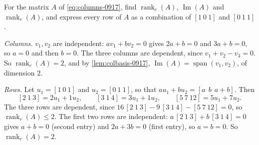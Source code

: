 \begin{exercisebox}
\begin{exercise}\label{ex:example-rank-0917}
    For the matrix $A$ of \cref{eq:columns-0917}, find $\operatorname{rank}_c(A)$,
    $\operatorname{Im}(A)$ and $\operatorname{rank}_r(A)$, and express every row of $A$ as a combination
    of $[1\ 0\ 1]$ and $[0\ 1\ 1]$.
\end{exercise}
\tcblower
\begin{wsolution}
    \emph{Columns.} $v_1, v_2$ are independent: $a v_1 + b v_2 = 0$ gives $2a + b = 0$ and
    $3a + b = 0$, so $a = 0$ and then $b = 0$. The three columns are dependent, since
    $v_1 + v_2 - v_3 = 0$. So $\operatorname{rank}_c(A) = 2$, and by \cref{lem:colbasis-0917},
    $\operatorname{Im}(A) = \operatorname{span}(v_1, v_2)$, of dimension $2$.

    \emph{Rows.} Let $u_1 = [1\ 0\ 1]$ and $u_2 = [0\ 1\ 1]$, so that $a u_1 + b u_2 = [a\ \ b\ \ a + b]$.
    Then
    \[[2\ 1\ 3] = 2 u_1 + 1 u_2, \qquad [3\ 1\ 4] = 3 u_1 + 1 u_2, \qquad [5\ 7\ 12] = 5 u_1 + 7 u_2.\]
    The three rows are dependent, since $16\,[2\ 1\ 3] - 9\,[3\ 1\ 4] - [5\ 7\ 12] = 0$, so
    $\operatorname{rank}_r(A) \leq 2$. The
    first two rows are independent: $a\,[2\ 1\ 3] + b\,[3\ 1\ 4] = 0$ gives $a + b = 0$ (second entry)
    and $2a + 3b = 0$ (first entry), so $a = b = 0$. So $\operatorname{rank}_r(A) = 2$.
\end{wsolution}
\end{exercisebox}

